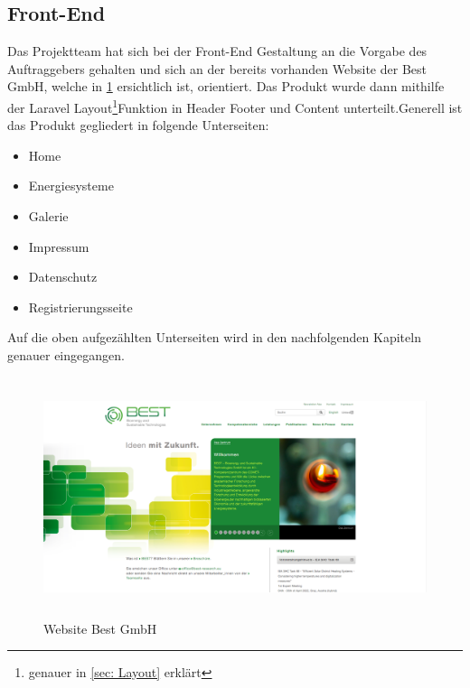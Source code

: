 \subsection{Front-End} \label{sec: Front-End}
Das Projektteam hat sich bei der Front-End Gestaltung an die Vorgabe des Auftraggebers gehalten und sich an der bereits vorhanden Website der Best GmbH, welche in \ref{fig:Website Best GmbH} ersichtlich ist, orientiert. Das Produkt wurde dann mithilfe der Laravel Layout\footnote{genauer in \autoref{sec: Layout} erklärt }Funktion in Header Footer und Content unterteilt.Generell ist das Produkt gegliedert in folgende Unterseiten: 
\begin{itemize}
	\item Home 
	\item Energiesysteme
	\item Galerie 
	\item Impressum 
	\item Datenschutz
	\item Registrierungsseite
\end{itemize}
Auf die oben aufgezählten Unterseiten wird in den nachfolgenden Kapiteln genauer eingegangen.
\begin{figure}[h]
	\centering
	\includegraphics[height=7cm,width=15cm]{images/BestGmbHSeite}
	\caption{Website Best GmbH}
	\label{fig:Website Best GmbH}
\end{figure}
\newpage


